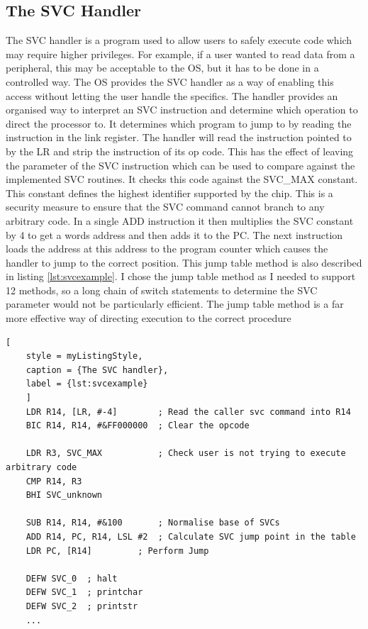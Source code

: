 \subsection{The SVC Handler}
The SVC handler is a program used to allow users to safely execute code which may require higher privileges. For example, if a user wanted to read data from a peripheral, this may be acceptable to the OS, but it has to be done in a controlled way. The OS provides the SVC handler as a way of enabling this access without letting the user handle the specifics. The handler provides an organised way to interpret an SVC instruction and determine which operation to direct the processor to. It determines which program to jump to by reading the instruction in the link register. The handler will read the instruction pointed to by the LR and strip the instruction of its op code. This has the effect of leaving the parameter of the SVC instruction which can be used to compare against the implemented SVC routines. It checks this code against the SVC\_MAX constant. This constant defines the highest identifier supported by the chip.  This is a security measure to ensure that the SVC command cannot branch to any arbitrary code. In a single ADD instruction it then multiplies the SVC constant by 4 to get a words address and then adds it to the PC. The next instruction loads the address at this address to the program counter which causes the handler to jump to the correct position. This jump table method is also described in listing \ref{lst:svcexample}. I chose the jump table method as I needed to support 12 methods, so a long chain of switch statements to determine the SVC parameter would not be particularly efficient. The jump table method is a far more effective way of directing execution to the correct procedure


\begin{lstlisting}[
	style = myListingStyle,
	caption = {The SVC handler},
	label = {lst:svcexample}
	]
	LDR R14, [LR, #-4]        ; Read the caller svc command into R14
	BIC R14, R14, #&FF000000  ; Clear the opcode
	
	LDR R3, SVC_MAX	          ; Check user is not trying to execute arbitrary code
	CMP R14, R3 
	BHI SVC_unknown
	
	SUB R14, R14, #&100       ; Normalise base of SVCs
	ADD R14, PC, R14, LSL #2  ; Calculate SVC jump point in the table
	LDR PC, [R14] 		  ; Perform Jump       
	
	DEFW SVC_0  ; halt
	DEFW SVC_1  ; printchar
	DEFW SVC_2  ; printstr
	...	
	
\end{lstlisting}


